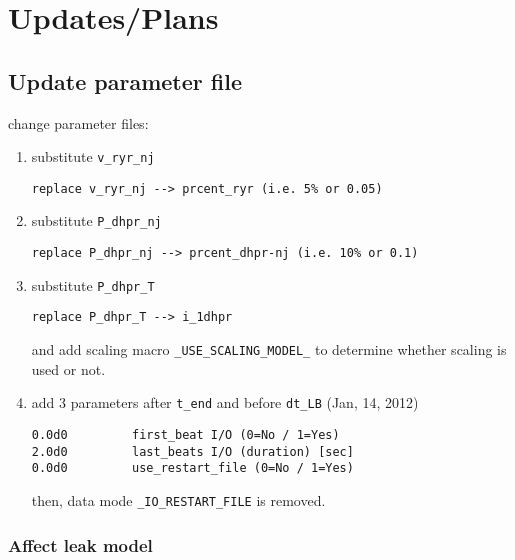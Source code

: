 
\chapter{Updates/Plans}
\label{sec:updates}

\section{Update parameter file}
\label{sec:parameter-file}

change parameter files:
\begin{enumerate}

\item  substitute \verb!v_ryr_nj!
\begin{verbatim}
replace v_ryr_nj --> prcent_ryr (i.e. 5% or 0.05)
\end{verbatim}

\item substitute \verb!P_dhpr_nj!
\begin{verbatim}
replace P_dhpr_nj --> prcent_dhpr-nj (i.e. 10% or 0.1)
\end{verbatim}


\item substitute \verb!P_dhpr_T!
\begin{verbatim}
replace P_dhpr_T --> i_1dhpr
\end{verbatim}
and add scaling macro \verb!_USE_SCALING_MODEL_! to determine whether
scaling is used or not. 

\item add 3 parameters after \verb!t_end! and before \verb!dt_LB! (Jan, 14,
2012)
\begin{verbatim}
0.0d0         first_beat I/O (0=No / 1=Yes)
2.0d0         last_beats I/O (duration) [sec]
0.0d0         use_restart_file (0=No / 1=Yes)
\end{verbatim}
then, data mode \verb!_IO_RESTART_FILE! is removed. 
\end{enumerate}

\subsection{Affect leak model}
\label{sec:affect-leak-model}

